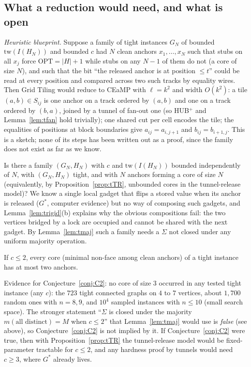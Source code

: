 \subsection{What a reduction would need, and what is open}
\emph{Heuristic blueprint.} Suppose a family of tight instances $G_N$ of bounded $\mathrm{tw}(I(H_N))$ and bounded $c$ had $N$ clean anchors $x_1,\dots,x_N$ such that stubs on all $x_j$ force $\mathrm{OPT}=|H|+1$ while stubs on any $N-1$ of them do not (a core of size $N$), and such that the bit ``the released anchor is at position $\le t$'' could be read at every position and compared across two such tracks by equality wires. Then Grid Tiling would reduce to CEaMP with $\ell=k^2$ and width $O(k^2)$: a tile $(a,b)\in S_{ij}$ is one anchor on a track ordered by $(a,b)$ and one on a track ordered by $(b,a)$, joined by a tunnel of fan-out one (so HUB$^+$ and Lemma~\ref{lem:tfan} hold trivially); one shared cut per cell encodes the tile; the equalities of positions at block boundaries give $a_{ij}=a_{i,j+1}$ and $b_{ij}=b_{i+1,j}$. This is a sketch; none of its steps has been written out as a proof, since the family does not exist as far as we know.
\begin{problem}\label{op:chain}
Is there a family $(G_N,H_N)$ with $c$ and $\mathrm{tw}(I(H_N))$ bounded independently of $N$, with $(G_N,H_N)$ tight, and with $N$ anchors forming a core of size $N$ (equivalently, by Proposition~\ref{prop:tTR}, unbounded cores in the tunnel-release model)? We know a single local gadget that flips a stored value when its anchor is released ($G^*$, computer evidence) but no way of composing such gadgets, and Lemma~\ref{lem:trigid}(b) explains why the obvious compositions fail: the two vertices bridged by a lock are occupied and cannot be shared with the next gadget. By Lemma~\ref{lem:tmaj} such a family needs a $\Sigma$ not closed under any uniform majority operation.
\end{problem}
\begin{conjecture}\label{conj:C2}
If $c\le2$, every core (minimal non-face among clean anchors) of a tight instance has at most two anchors.
\end{conjecture}
\noindent Evidence for Conjecture~\ref{conj:C2}: no core of size $3$ occurred in any tested tight instance (any $c$): the $723$ tight connected graphs on $4$ to $7$ vertices, about $1{,}700$ random ones with $n=8,9$, and $10^4$ sampled instances with $n\le10$ (small search space). The stronger statement ``$\Sigma$ is closed under the majority $m(\text{all distinct})=M$ when $c\le2$'' that Lemma~\ref{lem:tmaj} would use is \emph{false} (see above), so Conjecture~\ref{conj:C2} is not implied by it. If Conjecture~\ref{conj:C2} were true, then with Proposition~\ref{prop:tTR} the tunnel-release model would be fixed-parameter tractable for $c\le2$, and any hardness proof by tunnels would need $c\ge3$, where $G^*$ already lives.
